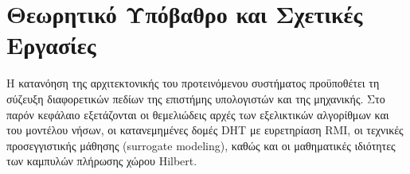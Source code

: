 
\chapter{Θεωρητικό Υπόβαθρο και Σχετικές Εργασίες}
\label{ch:background}

Η κατανόηση της αρχιτεκτονικής του προτεινόμενου συστήματος προϋποθέτει τη σύζευξη διαφορετικών πεδίων της επιστήμης υπολογιστών και της μηχανικής. Στο παρόν κεφάλαιο εξετάζονται οι θεμελιώδεις αρχές των εξελικτικών αλγορίθμων και του μοντέλου νήσων, οι κατανεμημένες δομές DHT με ευρετηρίαση RMI, οι τεχνικές προσεγγιστικής μάθησης (surrogate modeling), καθώς και οι μαθηματικές ιδιότητες των καμπυλών πλήρωσης χώρου Hilbert.
